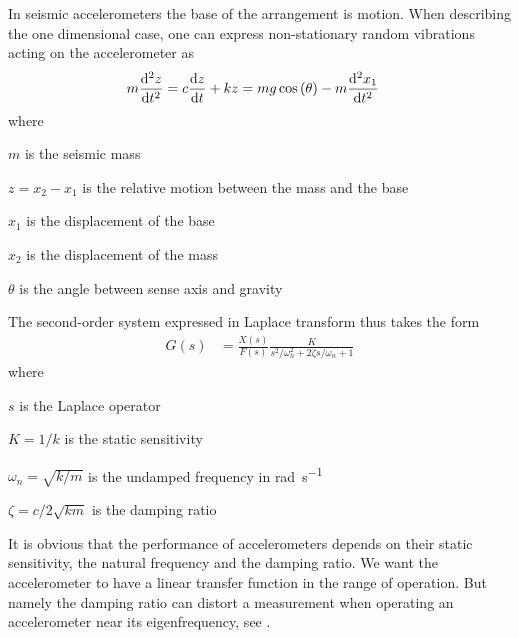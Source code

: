 In seismic accelerometers the base of the arrangement is motion. When describing the one dimensional case, one can express non-stationary random vibrations acting on the accelerometer as
\begin{align}
  m\dv[2]{z}{t} &= c\dv{z}{t} + kz = mg\cos\pqty{\theta}-m\dv[2]{x_1}{t}
\end{align}
where
\begin{description}[topsep=0ex, noitemsep]
  \item $m$ is the seismic mass
  \item $z=x_2-x_1$ is the relative motion between the mass and the base
  \item $x_1$ is the displacement of the base
  \item $x_2$ is the displacement of the mass
  \item $\theta$ is the angle between sense axis and gravity
\end{description}
The second-order system expressed in Laplace transform thus takes the form
\begin{align}
  G(s) &= \frac{X(s)}{F(s)} \frac{K}{s^2/\omega_n^2 + 2\zeta s/\omega_n + 1}
\end{align}
where
\begin{description}[topsep=0ex, noitemsep]
  \item $s$ is the Laplace operator
  \item $K=1/k$ is the static sensitivity
  \item $\omega_n=\sqrt{k/m}$ is the undamped frequency in \si{\radian\per\second}
  \item $\zeta=c/2\sqrt{km}$ is the damping ratio
\end{description}
It is obvious that the performance of accelerometers depends on their static sensitivity, the natural frequency and the damping ratio. We want the accelerometer to have a linear transfer function in the range of operation. But namely the damping ratio can distort a measurement when operating an accelerometer near its eigenfrequency, see .


